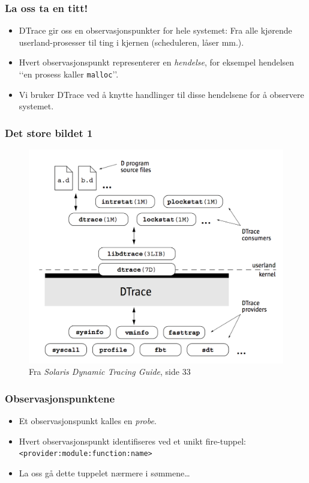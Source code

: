 \documentclass{beamer}
\begin{document}
 \begin{frame}
    \frametitle{La oss ta en titt!}
 \begin{itemize}

     \item DTrace gir oss en observasjonspunkter for hele systemet:
         Fra alle kjørende userland-prosesser til ting i kjernen
         (scheduleren, låser mm.).

     \item Hvert observasjonspunkt representerer en \emph{hendelse},
         for eksempel hendelsen ‘‘en prosess kaller \texttt{malloc}’’.

     \item Vi bruker DTrace ved å knytte handlinger til disse hendelsene
         for å observere systemet.
 \end{itemize}
 \end{frame}

 \begin{frame}
     \frametitle{Det store bildet 1}
\begin{figure}
\includegraphics[scale=0.40]{architecture.png}
\caption{Fra \emph{Solaris Dynamic Tracing Guide}, side 33}
\end{figure}
 \end{frame}

 \begin{frame}
    \frametitle{Observasjonspunktene}

 \begin{itemize}

     \item Et observasjonspunkt kalles en \emph{probe}.

     \item Hvert observasjonspunkt identifiseres ved et unikt fire-tuppel:
         \texttt{<provider:module:function:name>}

    \item La oss gå dette tuppelet nærmere i sømmene…

 \end{itemize}
 \end{frame}
\end{document}
